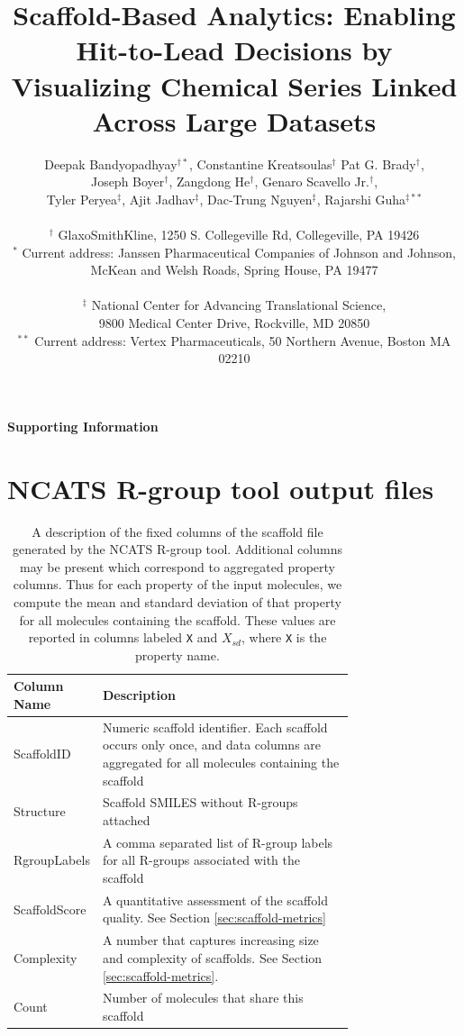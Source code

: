\documentclass[11pt,letterpaper,biochem]{article}
\title{Scaffold-Based Analytics: Enabling Hit-to-Lead Decisions by
  Visualizing Chemical Series Linked Across Large Datasets}
\author{Deepak Bandyopadhyay$^{\dagger *}$, Constantine Kreatsoulas$^{\dagger}$
  Pat G. Brady$^{\dagger}$, \\
  Joseph Boyer$^{\dagger}$, Zangdong He$^{\dagger}$, 
  Genaro Scavello Jr.$^{\dagger}$,\\
  Tyler Peryea$^{\ddagger}$,
  Ajit Jadhav$^{\ddagger}$,
  Dac-Trung Nguyen$^{\ddagger}$,
  Rajarshi Guha$^{\ddagger **}$\\
\\
$^{\dagger}$ GlaxoSmithKline, 1250 S. Collegeville Rd, Collegeville,
PA 19426 \\
$^{*}$ Current address: Janssen Pharmaceutical Companies of Johnson and Johnson, \\
McKean and Welsh Roads, Spring House, PA 19477 \\
\\
$^{\ddagger}$ National Center for Advancing Translational Science, \\
9800 Medical Center Drive, Rockville, MD 20850 \\
$^{**}$ Current address: Vertex Pharmaceuticals, 50 Northern Avenue, Boston MA 02210}
\begin{document}
\begin{center}
  {\huge \textbf{Supporting Information}}
\end{center}
\begin{minipage}{\textwidth}
   \maketitle
\end{minipage}

\newpage 

\section{NCATS R-group tool output files}
\label{sec:ncats-r-group}

\begin{table}[h]
  \centering
  \caption{A description of the fixed columns of the scaffold file generated
    by the NCATS R-group tool. Additional columns may be present which
    correspond to aggregated property columns. Thus for each
    property of the input molecules, we compute the mean and standard
    deviation of that property for all molecules containing the
    scaffold. These values are reported in columns labeled \texttt{X} and
    \texttt{$X_{sd}$}, where \texttt{X} is the property name.}
  \vspace{0.1in}
  \begin{tabular}[h]{lp{0.75\linewidth}}
    \hline
    \textbf{Column Name} & \textbf{Description} \\
    \hline
    ScaffoldID & Numeric scaffold identifier. Each scaffold occurs only
    once, and data columns are aggregated for all molecules containing the
    scaffold \\
    Structure & Scaffold SMILES without R-groups attached \\
    RgroupLabels & A comma separated list of R-group labels for
    all R-groups associated with the scaffold \\
    ScaffoldScore & A quantitative assessment of the scaffold quality.
    See Section \ref{sec:scaffold-metrics} \\
    Complexity & A number that captures increasing size and complexity of
    scaffolds. See Section \ref{sec:scaffold-metrics}.  \\
    Count & Number of molecules that share this scaffold \\
    \hline
  \end{tabular}
  \label{table:scaffoldfilecolumns}
\end{table}
\end{document}
